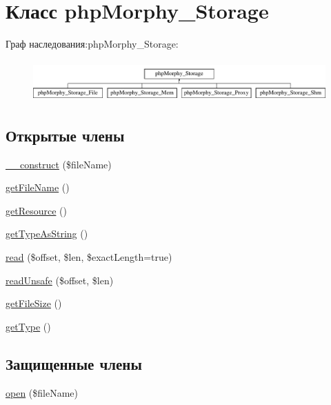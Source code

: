 \hypertarget{classphpMorphy__Storage}{
\section{Класс phpMorphy\_\-Storage}
\label{classphpMorphy__Storage}
}
Граф наследования:phpMorphy\_\-Storage:\begin{figure}[H]
\begin{center}
\leavevmode
\includegraphics[height=1.590909cm]{classphpMorphy__Storage}
\end{center}
\end{figure}
\subsection*{Открытые члены}
\begin{DoxyCompactItemize}
\item 
\hyperlink{classphpMorphy__Storage_a84a8c46bf81898a79a8a904ca2482907}{\_\-\_\-construct} (\$fileName)
\item 
\hyperlink{classphpMorphy__Storage_a8cb150cf980885e737eeb9c4f736abc0}{getFileName} ()
\item 
\hyperlink{classphpMorphy__Storage_a594c4e85c3e00b2f23f0c41227608143}{getResource} ()
\item 
\hyperlink{classphpMorphy__Storage_a29106b8b856f4e7a7b55145f1b2da83f}{getTypeAsString} ()
\item 
\hyperlink{classphpMorphy__Storage_ac132f6895432571d3a802e41ce11fd78}{read} (\$offset, \$len, \$exactLength=true)
\item 
\hyperlink{classphpMorphy__Storage_a45e0c83fbd16cd1bc8440c16022a8956}{readUnsafe} (\$offset, \$len)
\item 
\hyperlink{classphpMorphy__Storage_a1096f2e06f491f7e01a846741702ffb3}{getFileSize} ()
\item 
\hyperlink{classphpMorphy__Storage_a8d95cddeedcce622c0c6fa3bcd0b324f}{getType} ()
\end{DoxyCompactItemize}
\subsection*{Защищенные члены}
\begin{DoxyCompactItemize}
\item 
\hyperlink{classphpMorphy__Storage_a13aa0abfdc8e58b494b336fb41bc5c60}{open} (\$fileName)
\end{DoxyCompactItemize}
